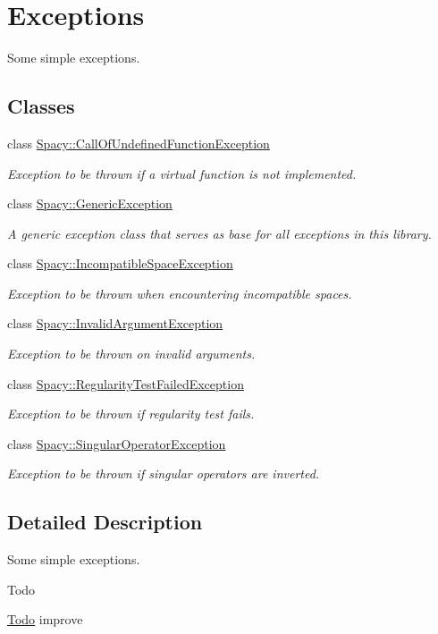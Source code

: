 \hypertarget{group__ExceptionGroup}{}\section{Exceptions}
\label{group__ExceptionGroup}


Some simple exceptions.  


\subsection*{Classes}
\begin{DoxyCompactItemize}
\item 
class \hyperlink{classSpacy_1_1CallOfUndefinedFunctionException}{Spacy\+::\+Call\+Of\+Undefined\+Function\+Exception}
\begin{DoxyCompactList}\small\item\em Exception to be thrown if a virtual function is not implemented. \end{DoxyCompactList}\item 
class \hyperlink{classSpacy_1_1GenericException}{Spacy\+::\+Generic\+Exception}
\begin{DoxyCompactList}\small\item\em A generic exception class that serves as base for all exceptions in this library. \end{DoxyCompactList}\item 
class \hyperlink{classSpacy_1_1IncompatibleSpaceException}{Spacy\+::\+Incompatible\+Space\+Exception}
\begin{DoxyCompactList}\small\item\em Exception to be thrown when encountering incompatible spaces. \end{DoxyCompactList}\item 
class \hyperlink{classSpacy_1_1InvalidArgumentException}{Spacy\+::\+Invalid\+Argument\+Exception}
\begin{DoxyCompactList}\small\item\em Exception to be thrown on invalid arguments. \end{DoxyCompactList}\item 
class \hyperlink{classSpacy_1_1RegularityTestFailedException}{Spacy\+::\+Regularity\+Test\+Failed\+Exception}
\begin{DoxyCompactList}\small\item\em Exception to be thrown if regularity test fails. \end{DoxyCompactList}\item 
class \hyperlink{classSpacy_1_1SingularOperatorException}{Spacy\+::\+Singular\+Operator\+Exception}
\begin{DoxyCompactList}\small\item\em Exception to be thrown if singular operators are inverted. \end{DoxyCompactList}\end{DoxyCompactItemize}


\subsection{Detailed Description}
Some simple exceptions. 

\begin{DoxyRefDesc}{Todo}
\item[\hyperlink{todo__todo000001}{Todo}]improve \end{DoxyRefDesc}

